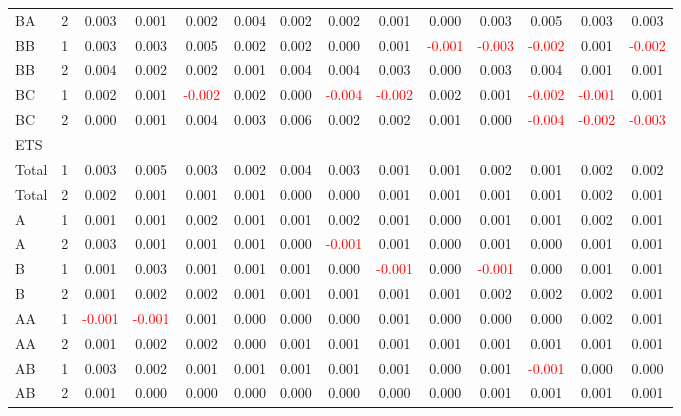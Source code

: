 \begin{table}[H]
{\begin{tabular}{llcccccccccccc}
BA & 2 & 0.003 & 0.001 & 0.002 & 0.004 & 0.002 & 0.002 & 0.001 & 0.000 & 0.003 & 0.005 & 0.003 & 0.003\\
BB & 1 & 0.003 & 0.003 & 0.005 & 0.002 & 0.002 & 0.000 & 0.001 & \textcolor{red}{-0.001} & \textcolor{red}{-0.003} & \textcolor{red}{-0.002} & 0.001 & \textcolor{red}{-0.002}\\
BB & 2 & 0.004 & 0.002 & 0.002 & 0.001 & 0.004 & 0.004 & 0.003 & 0.000 & 0.003 & 0.004 & 0.001 & 0.001\\
BC & 1 & 0.002 & 0.001 & \textcolor{red}{-0.002} & 0.002 & 0.000 & \textcolor{red}{-0.004} & \textcolor{red}{-0.002} & 0.002 & 0.001 & \textcolor{red}{-0.002} & \textcolor{red}{-0.001} & 0.001\\
BC & 2 & 0.000 & 0.001 & 0.004 & 0.003 & 0.006 & 0.002 & 0.002 & 0.001 & 0.000 & \textcolor{red}{-0.004} & \textcolor{red}{-0.002} & \textcolor{red}{-0.003}\\
\hline
ETS &  &  &  &  &  &  &  &  &  &  &  &  & \\
\hline
Total & 1 & 0.003 & 0.005 & 0.003 & 0.002 & 0.004 & 0.003 & 0.001 & 0.001 & 0.002 & 0.001 & 0.002 & 0.002\\
Total & 2 & 0.002 & 0.001 & 0.001 & 0.001 & 0.000 & 0.000 & 0.001 & 0.001 & 0.001 & 0.001 & 0.002 & 0.001\\
A & 1 & 0.001 & 0.001 & 0.002 & 0.001 & 0.001 & 0.002 & 0.001 & 0.000 & 0.001 & 0.001 & 0.002 & 0.001\\
A & 2 & 0.003 & 0.001 & 0.001 & 0.001 & 0.000 & \textcolor{red}{-0.001} & 0.001 & 0.000 & 0.001 & 0.000 & 0.001 & 0.001\\
B & 1 & 0.001 & 0.003 & 0.001 & 0.001 & 0.001 & 0.000 & \textcolor{red}{-0.001} & 0.000 & \textcolor{red}{-0.001} & 0.000 & 0.001 & 0.001\\
B & 2 & 0.001 & 0.002 & 0.002 & 0.001 & 0.001 & 0.001 & 0.001 & 0.001 & 0.002 & 0.002 & 0.002 & 0.001\\
AA & 1 & \textcolor{red}{-0.001} & \textcolor{red}{-0.001} & 0.001 & 0.000 & 0.000 & 0.000 & 0.001 & 0.000 & 0.000 & 0.000 & 0.002 & 0.001\\
AA & 2 & 0.001 & 0.002 & 0.002 & 0.000 & 0.001 & 0.001 & 0.001 & 0.001 & 0.001 & 0.001 & 0.001 & 0.001\\
AB & 1 & 0.003 & 0.002 & 0.001 & 0.001 & 0.001 & 0.001 & 0.001 & 0.000 & 0.001 & \textcolor{red}{-0.001} & 0.000 & 0.000\\
AB & 2 & 0.001 & 0.000 & 0.000 & 0.000 & 0.000 & 0.000 & 0.000 & 0.000 & 0.001 & 0.001 & 0.001 & 0.001\\

\end{tabular}}
\end{table}
